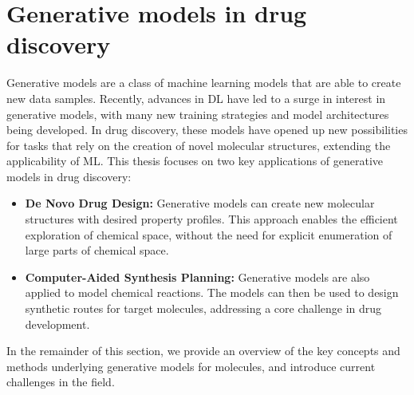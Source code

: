 \section{Generative models in drug discovery}
Generative models are a class of machine learning models that are able to create new data samples.
Recently, advances in \ac{DL} have led to a surge in interest in generative models, with many new
training strategies and model architectures being developed. In drug discovery, these models have
opened up new possibilities for tasks that rely on the creation of novel molecular structures,
extending the applicability of \ac{ML}. This thesis focuses on two key applications of generative
models in drug discovery:
\begin{itemize}
      \item \textbf{De Novo Drug Design:} Generative models can create new molecular structures with desired property
            profiles. This approach enables the efficient exploration of chemical space, without the need for
            explicit enumeration of large parts of chemical space.
      \item \textbf{Computer-Aided Synthesis Planning:} Generative models are also applied to model
            chemical reactions. The models can then be used to design synthetic routes for target
            molecules, addressing a core challenge in drug development.
\end{itemize}

In the remainder of this section, we provide an overview of the key concepts and methods underlying
generative models for molecules, and introduce current challenges in the field.

